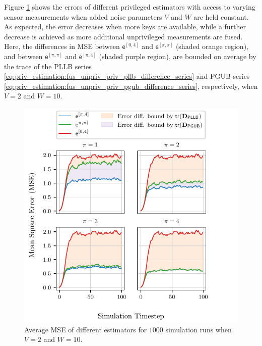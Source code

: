 Figure \ref{fig:priv_estimation:fus_mse_privs} shows the errors of different privileged estimators with access to varying sensor measurements when added noise parameters $V$ and $W$ are held constant. As expected, the error decreases when more keys are available, while a further decrease is achieved as more additional unprivileged measurements are fused. Here, the differences in MSE between $\mathsf{e}^{[0,4]}$ and $\mathsf{e}^{[\pi,\pi]}$ (shaded orange region), and between $\mathsf{e}^{[\pi,\pi]}$ and $\mathsf{e}^{[\pi,4]}$ (shaded purple region), are bounded on average by the trace of the PLLB series \eqref{eq:priv_estimation:fus_unpriv_priv_pllb_difference_series} and PGUB series \eqref{eq:priv_estimation:fus_unpriv_priv_pgub_difference_series}, respectively, when $V=2$ and $W=10$.
\begin{figure}[htbp]
  \centering
  \includegraphics{figures/priv_estimation_fus_mse_privs.pdf}
  \caption{Average MSE of different estimators for $1000$ simulation runs when $V=2$ and $W=10$.}
  \label{fig:priv_estimation:fus_mse_privs}
\end{figure}

